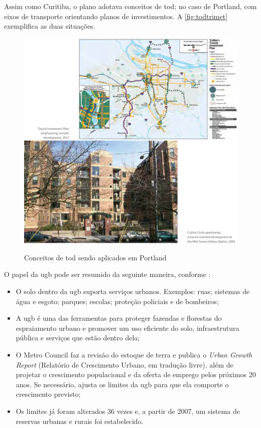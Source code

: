 	Assim como Curitiba, o plano adotava conceitos de \gls{tod}; no caso de Portland, com eixos de transporte orientando planos de investimentos. A \autoref{fig:todtrimet} exemplifica as duas situações.
	
	\begin{figure}
		\centering
		\caption{Conceitos de \gls{tod} sendo aplicados em Portland}
		\includegraphics[width=0.9\linewidth]{img/trimet2015a_01}
		\label{fig:todtrimet}
	\end{figure}

	O papel da \gls{ugb} pode ser resumido da seguinte maneira, conforme \cite{metro2019a}:

	\begin{itemize}
		\item O solo dentro da \gls{ugb} suporta serviços urbanos. Exemplos: ruas; sistemas de água e esgoto; parques; escolas; proteção policiais e de bombeiros;
		\item A \gls{ugb} é uma das ferramentas para proteger fazendas e florestas do espraiamento urbano e promover um uso eficiente do solo, infraestrutura pública e serviços que estão dentro dela;
		\item O Metro Council faz a revisão do estoque de terra e publica o \textit{Urban Growth Report} (Relatório de Crescimento Urbano, em tradução livre), além de projetar o crescimento populacional e da oferta de emprego pelos próximos 20 anos. Se necessário, ajusta os limites da \gls{ugb} para que ela comporte o crescimento previsto;
		\item Os limites já foram alterados 36 vezes e, a partir de 2007, um sistema de reservas urbanas e rurais foi estabelecido.
	\end{itemize}
	
